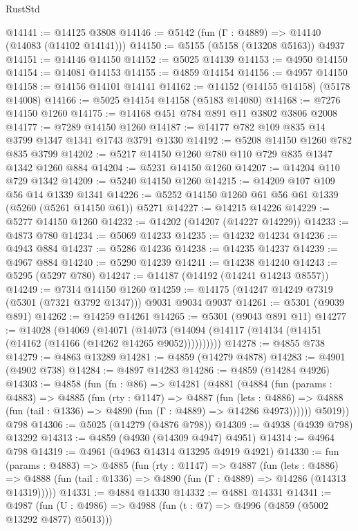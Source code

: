 \begin{lexlean}{RustStd}
\begin{coremodule}
@14141 := @14125 @3808
@14146 := @5142 (fun (Γ : @4889) => @14140 (@14083 (@14102 @14141)))
@14150 := @5155 (@5158 (@13208 @5163)) @4937
@14151 := @14146 @14150
@14152 := @5025 @14139
@14153 := @4950 @14150
@14154 := @14081 @14153
@14155 := @4859 @14154
@14156 := @4957 @14150
@14158 := @14156 @14101 @14141
@14162 := @14152 (@14155 @14158) (@5178 @14008)
@14166 := @5025 @14154 @14158 (@5183 @14080)
@14168 := @7276 @14150 @1260
@14175 := @14168 @451 @784 @891 @11 @3802 @3806 @2008
@14177 := @7289 @14150 @1260
@14187 := @14177 @782 @109 @835 @14 @3799 @1347 @1341 @1743 @3791 @1330
@14192 := @5208 @14150 @1260 @782 @835 @3799
@14202 := @5217 @14150 @1260 @780 @110 @729 @835 @1347 @1342 @1260 @884
@14204 := @5231 @14150 @1260
@14207 := @14204 @110 @729 @1342
@14209 := @5240 @14150 @1260
@14215 := @14209 @107 @109 @56 @14 @1339 @1341
@14226 := @5252 @14150 @1260 @61 @56 @61 @1339 (@5260 (@5261 @14150 @61)) @5271
@14227 := @14215 @14226
@14229 := @5277 @14150 @1260
@14232 := @14202 (@14207 (@14227 @14229))
@14233 := @4873 @780
@14234 := @5069 @14233
@14235 := @14232 @14234
@14236 := @4943 @884
@14237 := @5286 @14236
@14238 := @14235 @14237
@14239 := @4967 @884
@14240 := @5290 @14239
@14241 := @14238 @14240
@14243 := @5295 (@5297 @780)
@14247 := @14187 (@14192 (@14241 @14243 @8557))
@14249 := @7314 @14150 @1260
@14259 := @14175 (@14247 @14249 @7319 (@5301 (@7321 @3792 @1347))) @9031 @9034 @9037
@14261 := @5301 (@9039 @891)
@14262 := @14259 @14261
@14265 := @5301 (@9043 @891 @11)
@14277 := @14028
    (@14069
      (@14071 (@14073 (@14094 (@14117 (@14134 (@14151 (@14162 (@14166 (@14262 @14265 @9052))))))))))
@14278 := @4855 @738
@14279 := @4863 @13289
@14281 := @4859 (@14279 @4878)
@14283 := @4901 (@4902 @738)
@14284 := @4897 @14283
@14286 := @4859 (@14284 @4926)
@14303 := @4858
    (fun (fn : @86) =>
    @14281
      (@4881
        (@4884
          (fun (params : @4883) =>
          @4885
            (fun (rty : @1147) =>
            @4887
              (fun (lets : @4886) =>
              @4888 (fun (tail : @1336) => @4890 (fun (Γ : @4889) => @14286 @4973))))))
        @5019))
    @798
@14306 := @5025 (@14279 (@4876 @798))
@14309 := @4938 (@4939 @798) @13292
@14313 := @4859 (@4930 (@14309 @4947) @4951)
@14314 := @4964 @798
@14319 := @4961 (@4963 @14314 @13295 @4919 @4921)
@14330 := fun (params : @4883) =>
  @4885
    (fun (rty : @1147) =>
    @4887
      (fun (lets : @4886) =>
      @4888 (fun (tail : @1336) => @4890 (fun (Γ : @4889) => @14286 (@14313 @14319)))))
@14331 := @4884 @14330
@14332 := @4881 @14331
@14341 := @4987
    (fun (U : @4986) => @4988 (fun (t : @7) => @4996 (@4859 (@5002 @13292 @4877) @5013)))

\end{coremodule}
\end{lexlean}
